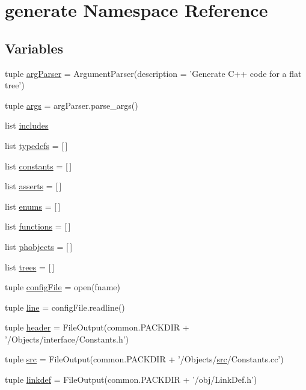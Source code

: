 \hypertarget{namespacegenerate}{
\section{generate Namespace Reference}
\label{namespacegenerate}
}
\subsection*{Variables}
\begin{DoxyCompactItemize}
\item 
tuple \hyperlink{namespacegenerate_a3f7717cfb006e7c3ada549d16f167a4d}{argParser} = ArgumentParser(description = 'Generate C++ code for a flat tree')
\item 
tuple \hyperlink{namespacegenerate_a4544a52bc41de9176876934433956c40}{args} = argParser.parse\_\-args()
\item 
list \hyperlink{namespacegenerate_ae24c825a39fcd7e77ebe88a9b9c3d2e2}{includes}
\item 
list \hyperlink{namespacegenerate_a56d0b1b4536d04b5dd7346c5459e16dd}{typedefs} = \mbox{[}$\,$\mbox{]}
\item 
list \hyperlink{namespacegenerate_ae15cb71cab91bceae5e3c231b1ef2288}{constants} = \mbox{[}$\,$\mbox{]}
\item 
list \hyperlink{namespacegenerate_aefbfd43f8e4e5c8e7075b0ee816d5d96}{asserts} = \mbox{[}$\,$\mbox{]}
\item 
list \hyperlink{namespacegenerate_a9d156f337a7e184da3766c544f6c0903}{enums} = \mbox{[}$\,$\mbox{]}
\item 
list \hyperlink{namespacegenerate_a05d9c77e59a8af4e394485410e7142af}{functions} = \mbox{[}$\,$\mbox{]}
\item 
list \hyperlink{namespacegenerate_ad6f1689d89c49747c02aeab9ec1bcca1}{phobjects} = \mbox{[}$\,$\mbox{]}
\item 
list \hyperlink{namespacegenerate_a08379947b9a86e5ad264e317f190a270}{trees} = \mbox{[}$\,$\mbox{]}
\item 
tuple \hyperlink{namespacegenerate_abd696df6ed13678cc8e8e83b973865ca}{configFile} = open(fname)
\item 
tuple \hyperlink{namespacegenerate_ac750e14543c2bb425f55a27c6f8f648b}{line} = configFile.readline()
\item 
tuple \hyperlink{namespacegenerate_a84be2876be8c5ad91d79a09a00459850}{header} = FileOutput(common.PACKDIR + '/Objects/interface/Constants.h')
\item 
tuple \hyperlink{namespacegenerate_a9b1edef2efe0773ac2184c462dfd73e9}{src} = FileOutput(common.PACKDIR + '/Objects/\hyperlink{namespacegenerate_a9b1edef2efe0773ac2184c462dfd73e9}{src}/Constants.cc')
\item 
tuple \hyperlink{namespacegenerate_a6a592a18c6fbaf7baf93f73691647e6d}{linkdef} = FileOutput(common.PACKDIR + '/obj/LinkDef.h')
\end{DoxyCompactItemize}


